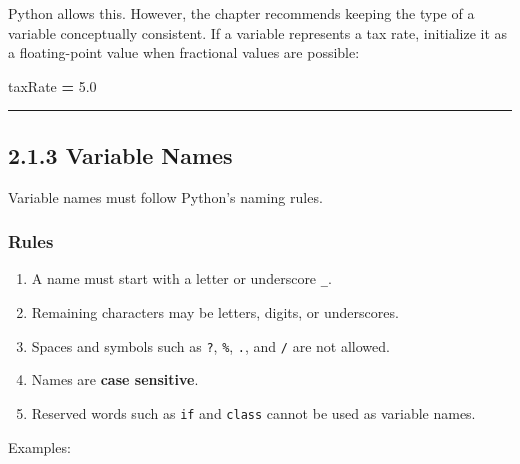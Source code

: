 \documentclass[
]{article}
\newenvironment{Shaded}{\begin{snugshade}}{\end{snugshade}}
\newcommand{\FloatTok}[1]{\textcolor[rgb]{0.00,0.00,0.81}{#1}}
\newcommand{\NormalTok}[1]{#1}
\newcommand{\OperatorTok}[1]{\textcolor[rgb]{0.81,0.36,0.00}{\textbf{#1}}}
\providecommand{\tightlist}{%
  \setlength{\itemsep}{0pt}\setlength{\parskip}{0pt}}
\begin{document}
Python allows this. However, the chapter recommends keeping the type of
a variable conceptually consistent. If a variable represents a tax rate,
initialize it as a floating-point value when fractional values are
possible:

\begin{Shaded}
\begin{Highlighting}[]
\NormalTok{taxRate }\OperatorTok{=} \FloatTok{5.0}
\end{Highlighting}
\end{Shaded}

\begin{center}\rule{0.5\linewidth}{0.5pt}\end{center}

\subsection{2.1.3 Variable Names}\label{variable-names}

Variable names must follow Python's naming rules.

\subsubsection{Rules}\label{rules}

\begin{enumerate}
\def\labelenumi{\arabic{enumi}.}
\tightlist
\item
  A name must start with a letter or underscore \texttt{\_}.
\item
  Remaining characters may be letters, digits, or underscores.
\item
  Spaces and symbols such as \texttt{?}, \texttt{\%}, \texttt{.}, and
  \texttt{/} are not allowed.
\item
  Names are \textbf{case sensitive}.
\item
  Reserved words such as \texttt{if} and \texttt{class} cannot be used
  as variable names.
\end{enumerate}

Examples:
\end{document}
